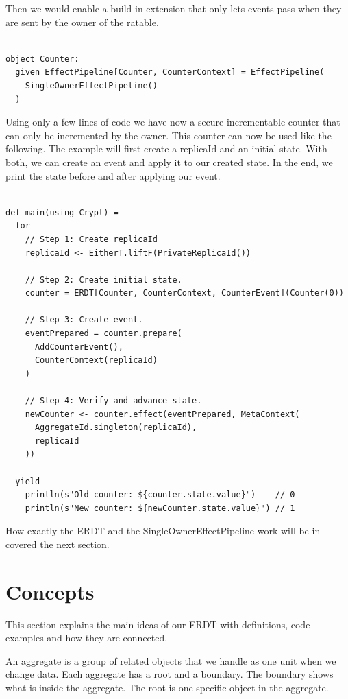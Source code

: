 \documentclass[
	ngerman,
	ruledheaders=section,   %
	class=report,		    %
	thesis={type=bachelor}, %
	accentcolor=9c,			%
	custommargins=true,    %
	marginpar=false,        %
	parskip=half-,          %
	fontsize=11pt,          %
]{tudapub}
\begin{document}
Then we would enable a build-in extension that only lets events pass when they are sent by the owner of the ratable.

\begin{lstlisting}

object Counter:
  given EffectPipeline[Counter, CounterContext] = EffectPipeline(
    SingleOwnerEffectPipeline()
  )

\end{lstlisting}

Using only a few lines of code we have now a secure incrementable counter that can only be incremented by the owner. This counter can now be used like the following. The example will first create a replicaId and an initial state. With both, we can create an event and apply it to our created state. In the end, we print the state before and after applying our event.

\begin{lstlisting}
    
def main(using Crypt) = 
  for
    // Step 1: Create replicaId
    replicaId <- EitherT.liftF(PrivateReplicaId())

    // Step 2: Create initial state.
    counter = ERDT[Counter, CounterContext, CounterEvent](Counter(0))

    // Step 3: Create event.
    eventPrepared = counter.prepare(
      AddCounterEvent(),
      CounterContext(replicaId)
    )

    // Step 4: Verify and advance state.
    newCounter <- counter.effect(eventPrepared, MetaContext(
      AggregateId.singleton(replicaId), 
      replicaId
    ))

  yield
    println(s"Old counter: ${counter.state.value}")    // 0
    println(s"New counter: ${newCounter.state.value}") // 1

\end{lstlisting}

How exactly the ERDT and the SingleOwnerEffectPipeline work will be in covered the next section.

\section{Concepts}

This section explains the main ideas of our ERDT with definitions, code examples and how they are connected.


An aggregate is a group of related objects that we handle as one unit when we change data. Each aggregate has a root and a boundary. The boundary shows what is inside the aggregate. The root is one specific object in the aggregate. 
\end{document}
